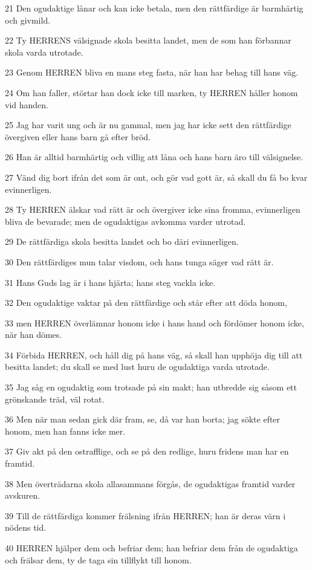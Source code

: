 \par 21 Den ogudaktige lånar och kan icke betala, men den rättfärdige är barmhärtig och givmild.
\par 22 Ty HERRENS välsignade skola besitta landet, men de som han förbannar skola varda utrotade.
\par 23 Genom HERREN bliva en mans steg fasta, när han har behag till hans väg.
\par 24 Om han faller, störtar han dock icke till marken, ty HERREN håller honom vid handen.
\par 25 Jag har varit ung och är nu gammal, men jag har icke sett den rättfärdige övergiven eller hans barn gå efter bröd.
\par 26 Han är alltid barmhärtig och villig att låna och hans barn äro till välsignelse.
\par 27 Vänd dig bort ifrån det som är ont, och gör vad gott är, så skall du få bo kvar evinnerligen.
\par 28 Ty HERREN älskar vad rätt är och övergiver icke sina fromma, evinnerligen bliva de bevarade; men de ogudaktigas avkomma varder utrotad.
\par 29 De rättfärdiga skola besitta landet och bo däri evinnerligen.
\par 30 Den rättfärdiges mun talar visdom, och hans tunga säger vad rätt är.
\par 31 Hans Guds lag är i hans hjärta; hans steg vackla icke.
\par 32 Den ogudaktige vaktar på den rättfärdige och står efter att döda honom,
\par 33 men HERREN överlämnar honom icke i hans hand och fördömer honom icke, när han dömes.
\par 34 Förbida HERREN, och håll dig på hans väg, så skall han upphöja dig till att besitta landet; du skall se med lust huru de ogudaktiga varda utrotade.
\par 35 Jag såg en ogudaktig som trotsade på sin makt; han utbredde sig såsom ett grönskande träd, väl rotat.
\par 36 Men när man sedan gick där fram, se, då var han borta; jag sökte efter honom, men han fanns icke mer.
\par 37 Giv akt på den ostrafflige, och se på den redlige, huru fridens man har en framtid.
\par 38 Men överträdarna skola allasammans förgås, de ogudaktigas framtid varder avskuren.
\par 39 Till de rättfärdiga kommer frälsning ifrån HERREN; han är deras värn i nödens tid.
\par 40 HERREN hjälper dem och befriar dem; han befriar dem från de ogudaktiga och frälsar dem, ty de taga sin tillflykt till honom.

